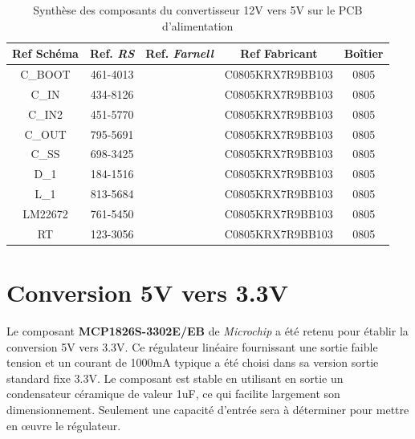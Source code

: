 				\begin{table}
					\begin{center}
						\begin{tabular}{|c|c|c|c|c|}
						\hline
						\textbf{Ref Schéma} & Ref. \textit{RS} & Ref. \textit{Farnell} & Ref Fabricant & Boîtier \\ 
						\hline
						C\_BOOT & 461-4013 & & C0805KRX7R9BB103 & 0805 \\
						\hline
						C\_IN & 434-8126 & & C0805KRX7R9BB103 & 0805 \\
						\hline
						C\_IN2 & 451-5770 & & C0805KRX7R9BB103 & 0805 \\
						\hline
						C\_OUT & 795-5691 & & C0805KRX7R9BB103 & 0805 \\
						\hline
						C\_SS & 698-3425 & & C0805KRX7R9BB103 & 0805 \\
						\hline
						D\_1 & 184-1516 & & C0805KRX7R9BB103 & 0805 \\
						\hline
						L\_1 & 813-5684 & & C0805KRX7R9BB103 & 0805 \\
						\hline
						LM22672 & 761-5450 & & C0805KRX7R9BB103 & 0805 \\
						\hline
						RT & 123-3056 & & C0805KRX7R9BB103 & 0805 \\
						\hline
						\end{tabular}
					\end{center}
					\caption{Synthèse des composants du convertisseur 12V vers 5V sur le PCB d'alimentation}
					\label{synth_composants}
				\end{table}
				
				
				
				
				
			
		\section{Conversion 5V vers 3.3V}
			
		Le composant \textbf{MCP1826S-3302E/EB} de \textit{Microchip} a été retenu pour établir la conversion 5V vers 3.3V. Ce régulateur linéaire fournissant une sortie faible tension et un courant de 1000mA typique a été choisi dans sa version sortie standard fixe 3.3V. Le composant est stable en utilisant en sortie un condensateur céramique de valeur 1uF, ce qui facilite largement son dimensionnement. Seulement une capacité d'entrée sera à déterminer pour mettre en œuvre le régulateur.
	
